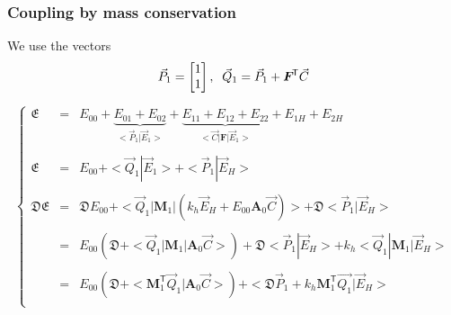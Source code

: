 \documentclass[aps,onecolumn,12pt]{revtex4}
\newcommand{\mytrn}[1]{{#1}^{\!\mathsf{T}}}
\newcommand{\mymat}[1]{{\bm{#1}}}
\begin{document}
\subsubsection{Coupling by mass conservation}
We use the vectors
\begin{equation}
	\vec{P}_1 = 
	\begin{bmatrix}
	1\\
	1\\
	\end{bmatrix},
	\;\;
\vec{Q}_1  =  \vec{P}_1 + \mytrn{\mymat{F}}\vec{C} \\
\end{equation}

\begin{equation}
\left\lbrace
\begin{array}{rcl}
\mathfrak{E} & = & E_{00} + \underbrace{E_{01} + E_{02}}_{<\vec{P}_1|\vec{E}_1>} + \underbrace{E_{11} + E_{12} + E_{22}}_{<\vec{C}|\mymat{F}|\vec{E}_1>} + E_{1H} + E_{2H} \\
\\
\mathfrak{E} & = & E_{00} + <\vec{Q}_1|\vec{E}_1> +  <\vec{P}_1|\vec{E}_H>\\
\\
\mathfrak{D}\mathfrak{E} & = & 
\mathfrak{D} E_{00} + 
<\vec{Q}_1|\mymat{M}_1|\left(
	k_h  \vec{E}_H +E_{00} \mymat{A}_0 \vec{C} \right)> +  \mathfrak{D} <\vec{P}_1|\vec{E}_H>\\
	\\
 & = & E_{00} \left( \mathfrak{D} + <\vec{Q}_1|\mymat{M}_1|\mymat{A}_0\vec{C}>\right) + 
\mathfrak{D} <\vec{P}_1|\vec{E}_H> + k_h <\vec{Q}_1|\mymat{M}_1|\vec{E}_H>\\
\\
& = & E_{00} \left( \mathfrak{D} + <\mytrn{\mymat{M}}_1\vec{Q}_1|\mymat{A}_0\vec{C}>\right) + < \mathfrak{D} \vec{P}_1 + k_h\mytrn{\mymat{M}}_1 \vec{Q_1} | \vec{E}_H>\\
\end{array}
\right.
\end{equation}
\end{document}
